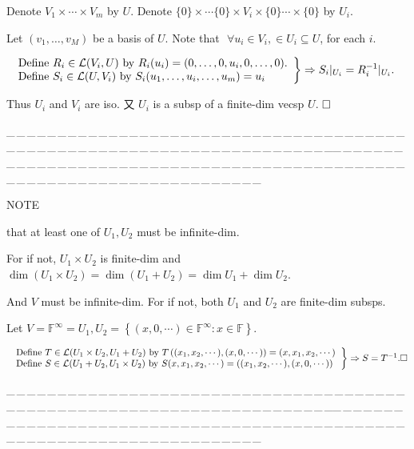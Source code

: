 \documentclass[a4paper, 11pt, UTF8]{article}
\def\Lm{\mathcal{L}}
\def\Fbb{{\mathbb{F}}}
\def\ProblemEnding{{\tiny \_\,\_\,\_\,\_\,\_\,\_\,\_\,\_\,\_\,\_\,\_\,\_\,\_\,\_\,\_\,\_\,\_\,\_\,\_\,\_\,\_\,\_\,\_\,\_\,\_\,\_\,\_\,\_\,\_\,\_\,\_\,\_\,\_\,\_\,\_\,\_\,\_\,\_\,\_\,\_\,\_\,\_\,\_\,\_\,\_\,\_\,\_\,\_\,\_\,\_\,\_\,\_\,\_\,\_\,\_\,\_\,\_\,\_\,\_\,\_\,\_\,\_\,\_\,\_\,\_\,\_\,\_\,\_\,\_\,\_\,\_\_\,\_\,\_\,\_\,\_\,\_\,\_\,\_\,\_\,\_\,\_\,\_\,\_\,\_\,\_\,\_\,\_\,\_\,\_\,\_\,\_\,\_\,\_\,\_\,\_\,\_\,\_\,\_\,\_\,\_\,\_\,\_\,\_\,\_\,\_\,\_\,\_\,\_\,\_\,\_\,\_\,\_\,\_\,\_\,\_\,\_\,\_\,\_\,\_\,\_\,\_\,\_\,\_\,\_\,\_\,\_\,\_\,\_\,\_\,\_\,\_\,\_\,\_\,\_\,\_\,\_\,\_\,\_\,\_\,\_\,\_}}
\def\ChapterEnding{\rightline{\timesbfx\Large{E{\small NDED}}}\par\vspace{6pt}}
\begin{document}
\begin{large}
\ChapterEnding

Denote $V_1\times\cdots\times V_m$ by $U$. Denote $\{0\}\times\cdots\{0\}\times V_i\times\{0\}\cdots\times\{0\}$ by $U_i$.\par\quad
Let $(v_1,\dots,v_M)$ be a basis of $U$. Note that $\,\,\forall u_i\in V_i,\in U_i\subseteq U$, for each $i$.\par\quad
$\MathRightBrace{l}{$
Define $R_i\in\Lm(V_i,U)$ by $R_i(u_i)=(0,\dots,0,u_i,0,\dots,0).\\ $
Define $S_i\in\Lm(U,V_i)$ by $S_i(u_1,\dots,u_i,\dots,u_m)=u_i$
$}\Rightarrow S_i|_{U_i}=R_i^{-1}|_{U_i}.$\par\quad
Thus $U_i$ and $V_i$ are iso. 又 $U_i$ is a subsp of a finite-dim vecsp $U$. $\hfill\square$\par
\ProblemEnding\par

\par\quad
N{\small OTE} {\timessl that at least one of $U_1,U_2$ must be infinite-dim.\par\quad For if not, $U_1\times U_2$ is finite-dim and $\dim(U_1\times U_2)=\dim(U_1+U_2)=\dim U_1+\dim U_2.$}\par\quad
{\timessl And $V$ must be infinite-dim. For if not, both $U_1$ and $U_2$ are finite-dim subsps.}\par\quad
Let $V=\Fbb^\infty=U_1,U_2=\left\{(x,0,\cdots)\in\Fbb^\infty:x\in\Fbb\right\}.$\par\quad
$\MathRightBrace{l}{$
Define $T\in\Lm(U_1\times U_2,U_1+U_2)$ by $T\left((x_1,x_2,\cdots),(x,0,\cdots)\right)=(x,x_1,x_2,\cdots)\\ $
Define $S\in\Lm(U_1+U_2,U_1\times U_2)$ by $S(x,x_1,x_2,\cdots)=\left((x_1,x_2,\cdots),(x,0,\cdots)\right)$
$}\Rightarrow S=T^{-1}.\hfill\square$\par\vspace{5pt}
\ProblemEnding\par


\end{large}
\end{document}
